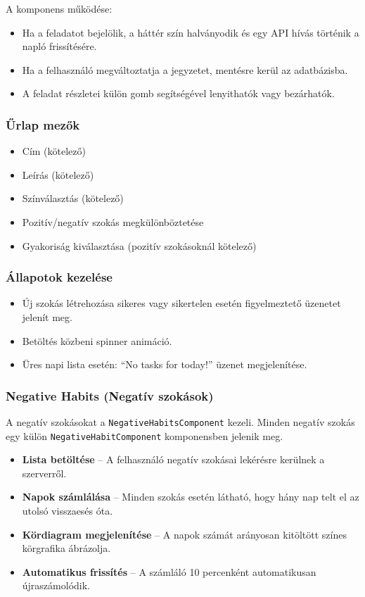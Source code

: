 \documentclass[12pt]{report}
\begin{document}
A komponens működése:
\begin{itemize}
  \item Ha a feladatot bejelölik, a háttér szín halványodik és egy API hívás történik a napló frissítésére.
  \item Ha a felhasználó megváltoztatja a jegyzetet, mentésre kerül az adatbázisba.
  \item A feladat részletei külön gomb segítségével lenyithatók vagy bezárhatók.
\end{itemize}

\subsubsection{Űrlap mezők}

\begin{itemize}
  \item Cím (kötelező)
  \item Leírás (kötelező)
  \item Színválasztás (kötelező)
  \item Pozitív/negatív szokás megkülönböztetése
  \item Gyakoriság kiválasztása (pozitív szokásoknál kötelező)
\end{itemize}

\subsubsection{Állapotok kezelése}

\begin{itemize}
  \item Új szokás létrehozása sikeres vagy sikertelen esetén figyelmeztető üzenetet jelenít meg.
  \item Betöltés közbeni spinner animáció.
  \item Üres napi lista esetén: ``No tasks for today!'' üzenet megjelenítése.
\end{itemize}

\subsubsection{Negative Habits (Negatív szokások)}

A negatív szokásokat a \texttt{NegativeHabitsComponent} kezeli. Minden negatív szokás egy külön \texttt{NegativeHabitComponent} komponensben jelenik meg.

\begin{itemize}
  \item \textbf{Lista betöltése} -- A felhasználó negatív szokásai lekérésre kerülnek a szerverről.
  \item \textbf{Napok számlálása} -- Minden szokás esetén látható, hogy hány nap telt el az utolsó visszaesés óta.
  \item \textbf{Kördiagram megjelenítése} -- A napok számát arányosan kitöltött színes körgrafika ábrázolja.
  \item \textbf{Automatikus frissítés} -- A számláló 10 percenként automatikusan újraszámolódik.
\end{itemize}
\end{document}
